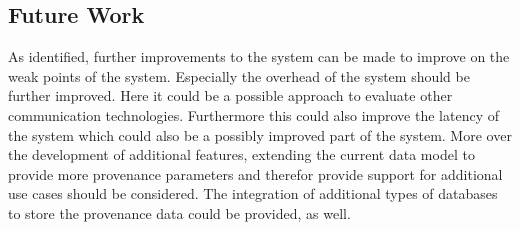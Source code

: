 \subsection{Future Work}
As identified, further improvements to the system can be made to improve on the weak points of the system. Especially the overhead of the system should be further improved. Here it could be a possible approach to evaluate other communication technologies. Furthermore this could also improve the latency of the system which could also be a possibly improved part of the system. More over the development of additional features, extending the current data model to provide more provenance parameters and therefor provide support for additional use cases should be considered. The integration of additional types of databases to store the provenance data could be provided, as well. 


